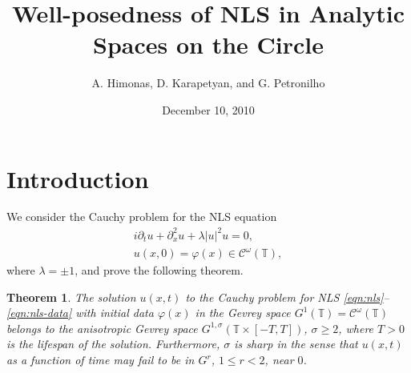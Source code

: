 \documentclass[12pt,reqno]{amsart}
\numberwithin{equation}{section}  %
\numberwithin{figure}{section}
\theoremstyle{plain}
\newtheorem{theorem}{Theorem}
\theoremstyle{definition}
\theoremstyle{remark}
\begin{document}
\title{Well-posedness of NLS in Analytic Spaces on the Circle}
\author{A. Himonas, D. Karapetyan, and G. Petronilho}
\date{December 10, 2010}
%
\maketitle
%
%
%
%
%
\section{Introduction}
\label{sec:introduction}
We consider the Cauchy problem for the NLS equation
%
\begin{gather}
  \label{eqn:nls}
  i\partial_tu+\partial_x^2u+\lambda |u|^2u=0,
  \\
  \label{eqn:nls-data}
  u(x,0)=\varphi(x) \in \mathcal{C}^\omega(\mathbb{T}),
\end{gather}
%
where $\lambda =\pm 1$, and prove the following theorem.
%
\begin{theorem}
  \label{thm:nls-analyt}
  The solution $u(x,t)$  to the Cauchy problem for NLS \eqref{eqn:nls}--
  \eqref{eqn:nls-data}  with   initial data $\varphi(x)$  in  the Gevrey space
  $G^1(\mathbb{T})=\mathcal{C}^\omega(\mathbb{T})$ belongs to the anisotropic
  Gevrey space $G^{1, \sigma}( \mathbb{T}\times [-T, T])$,  $\sigma \ge 2$, where
  $T>0$ is the lifespan of the solution. Furthermore, $\sigma$ is sharp in the
  sense that $u(x,t)$ as a function of  time  may fail to be in $G^r$, $1\le
  r<2$, near $0$.
\end{theorem}
%
%
%
%
%
%

%
%
%
%
%
%
%
%
\end{document}
